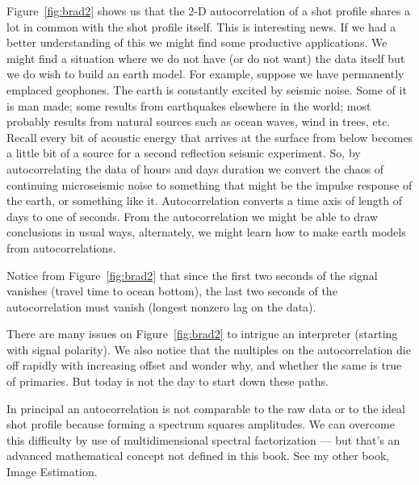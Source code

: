 \par
Figure~\ref{fig:brad2} shows us that the 2-D autocorrelation
of a shot profile shares a lot in common with the shot profile itself.
This is interesting news.
If we had a better understanding of this
we might find some productive applications.
We might find a situation where we do not have (or do not want)
the data itself but we do wish to build an earth model.
For example, suppose we have permanently emplaced geophones.
The earth is constantly excited by seismic noise.
Some of it is man made;  some results from earthquakes
elsewhere in the world; most probably results from natural
sources such as ocean waves, wind in trees, etc.
Recall every bit of acoustic energy that arrives at the surface from below
becomes a little bit of a source for a second reflection seismic experiment.
So, by autocorrelating the data of hours and days duration
we convert the chaos of continuing microseismic noise
to something that might be the impulse response of the earth,
or something like it.
Autocorrelation converts a time axis of length of days to one of seconds.
From the autocorrelation  we might be able to draw conclusions in usual ways,
alternately,
we might learn how to make earth models from autocorrelations.
\par
Notice from Figure~\ref{fig:brad2}
that since the first two seconds of the signal vanishes
(travel time to ocean bottom),
the last two seconds of the autocorrelation must vanish
(longest nonzero lag on the data).
\par


\par
There are many issues on
Figure~\ref{fig:brad2} to intrigue an interpreter
(starting with signal polarity).
We also notice that the multiples on the autocorrelation
die off rapidly with increasing offset and wonder why,
and whether the same is true of primaries.
But today is not the day to start down these paths.

\par
In principal an autocorrelation is not comparable to the raw data
or to the ideal shot profile because
forming a spectrum squares amplitudes.
We can overcome this difficulty by use of
multidimensional spectral factorization ---
but that's an advanced mathematical concept
not defined in this book.
See my other book, Image Estimation.





